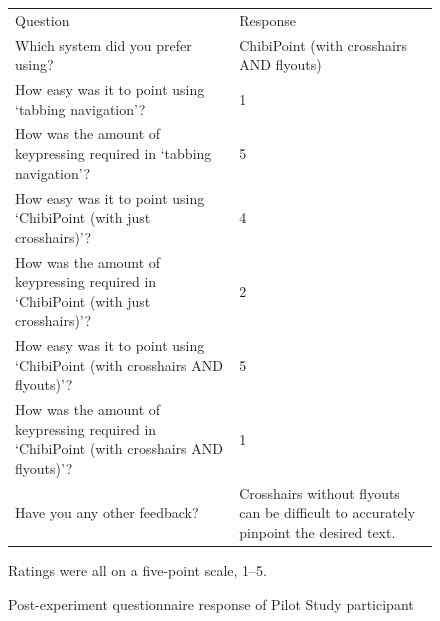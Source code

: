 \documentclass[a4paper, 12pt]{report}
\begin{document}
\begin{figure}[ht]
\begin{tabularx}{\textwidth}{X|X}
\hline\hline %
Question & Response \\ [0.5ex] %
Which system did you prefer using?	&	ChibiPoint (with crosshairs AND flyouts)	\\
How easy was it to point using `tabbing navigation'?	&	1	\\
How was the amount of keypressing required in `tabbing navigation'?	&	5	\\
How easy was it to point using `ChibiPoint (with just crosshairs)'?	&	4	\\
How was the amount of keypressing required in `ChibiPoint (with just crosshairs)'?	&	2	\\
How easy was it to point using `ChibiPoint (with crosshairs AND flyouts)'?	&	5	\\
How was the amount of keypressing required in `ChibiPoint (with crosshairs AND flyouts)'?	&	1	\\
Have you any other feedback?	&	Crosshairs without flyouts can be difficult to accurately pinpoint the desired text.	\\
\hline %
\end{tabularx}
\caption{Post-experiment questionnaire response of Pilot Study participant}
Ratings were all on a five-point scale, 1--5.
\label{fig:partic_pilotpost}
\end{figure}
\end{document}

